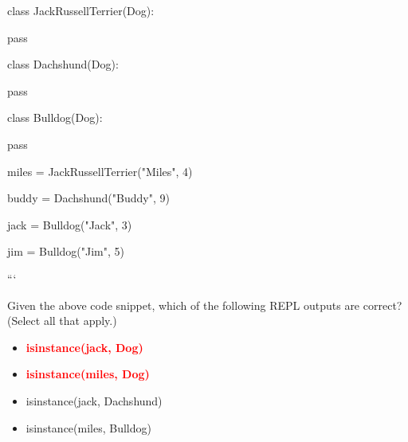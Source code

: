 \documentclass[12pt,a4paper]{article}
\begin{document}
\newline
class JackRussellTerrier(Dog):\newline

\newline
    pass\newline

\newline
\newline

\newline
class Dachshund(Dog):\newline

\newline
    pass\newline

\newline
\newline

\newline
class Bulldog(Dog):\newline

\newline
    pass\newline

\newline
\newline

\newline
miles = JackRussellTerrier("Miles", 4)\newline

\newline
buddy = Dachshund("Buddy", 9)\newline

\newline
jack = Bulldog("Jack", 3)\newline

\newline
jim = Bulldog("Jim", 5)\newline

\newline
```\newline

\newline
\newline

\newline
Given the above code snippet, which of the following REPL outputs are correct? (Select all that apply.)

\begin{itemize}
    \item[\textbf{A.}] \textcolor{red}{\textbf{isinstance(jack, Dog)}}
    \item[\textbf{B.}] \textcolor{red}{\textbf{isinstance(miles, Dog)}}
    \item[\textbf{C.}] isinstance(jack, Dachshund)
    \item[\textbf{D.}] isinstance(miles, Bulldog)
\end{itemize}
\end{document}
